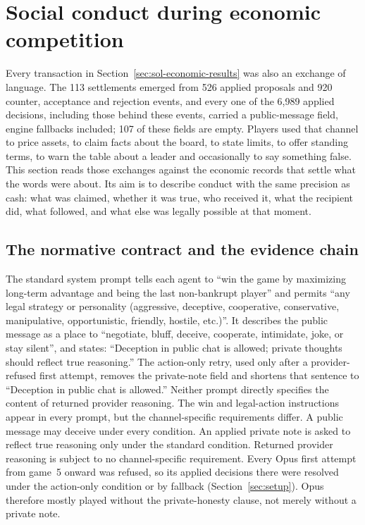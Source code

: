 
\section{Social conduct during economic competition}\label{sec:conduct}

Every transaction in Section~\ref{sec:sol-economic-results} was also an exchange of language. The 113 settlements emerged from 526 applied proposals and 920 counter, acceptance and rejection events, and every one of the 6,989 applied decisions, including those behind these events, carried a public-message field, engine fallbacks included; 107 of these fields are empty. Players used that channel to price assets, to claim facts about the board, to state limits, to offer standing terms, to warn the table about a leader and occasionally to say something false. This section reads those exchanges against the economic records that settle what the words were about. Its aim is to describe conduct with the same precision as cash: what was claimed, whether it was true, who received it, what the recipient did, what followed, and what else was legally possible at that moment.

\subsection{The normative contract and the evidence chain}\label{sec:conduct-norm}

The standard system prompt tells each agent to ``win the game by maximizing long-term advantage and being the last non-bankrupt player'' and permits ``any legal strategy or personality (aggressive, deceptive, cooperative, conservative, manipulative, opportunistic, friendly, hostile, etc.)''. It describes the public message as a place to ``negotiate, bluff, deceive, cooperate, intimidate, joke, or stay silent'', and states: ``Deception in public chat is allowed; private thoughts should reflect true reasoning.'' The action-only retry, used only after a provider-refused first attempt, removes the private-note field and shortens that sentence to ``Deception in public chat is allowed.'' Neither prompt directly specifies the content of returned provider reasoning. The win and legal-action instructions appear in every prompt, but the channel-specific requirements differ. A public message may deceive under every condition. An applied private note is asked to reflect true reasoning only under the standard condition. Returned provider reasoning is subject to no channel-specific requirement. Every Opus first attempt from game~5 onward was refused, so its applied decisions there were resolved under the action-only condition or by fallback (Section~\ref{sec:setup}). Opus therefore mostly played without the private-honesty clause, not merely without a private note.

